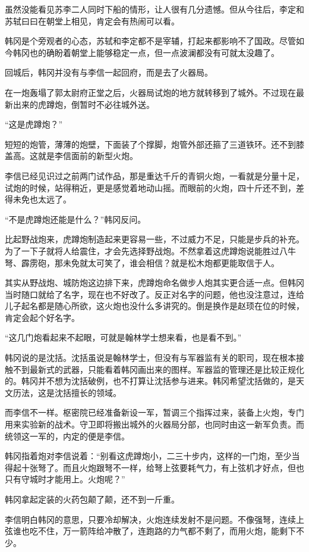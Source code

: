 虽然没能看见苏李二人同时下船的情形，让人很有几分遗憾。但从今往后，李定和苏轼曰曰在朝堂上相见，肯定会有热闹可以看。

韩冈是个旁观者的心态，苏轼和李定都不是宰辅，打起来都影响不了国政。尽管如今韩冈也的确盼着朝堂上能够稳定一点，但一点波澜都没有可就太没趣了。

回城后，韩冈并没有与李信一起回府，而是去了火器局。

在一炮轰塌了郭太尉府正堂之后，火器局试炮的地方就转移到了城外。不过现在最新出来的虎蹲炮，倒暂时不必往城外送。

“这是虎蹲炮？”

短短的炮管，薄薄的炮壁，下面装了个撑脚，炮管外部还箍了三道铁环。还不到膝盖高。这就是李信面前的新型火炮。

李信已经见识过之前两门试作品，那是重达千斤的青铜火炮，一看就是分量十足，试炮的时候，站得稍近，更是感觉着地动山摇。而眼前的火炮，四十斤还不到，差得未免也太远了。

“不是虎蹲炮还能是什么？”韩冈反问。

比起野战炮来，虎蹲炮制造起来更容易一些，不过威力不足，只能是步兵的补充。为了一下子就将人给震住，才会先选择野战炮。不然拿着这虎蹲炮说能胜过八牛弩、霹雳砲，那未免就太可笑了，谁会相信？就是松木炮都更能取信于人。

其实从野战炮、城防炮这边排下来，虎蹲炮命名做步人炮其实更合适一点。但韩冈当时随口就给了名字，现在也不好改了。反正对名字的问题，他也没注意过，连给儿子起名都是随心所欲，这火炮也没什么多讲究的。倒是换作是赵顼在位的时候，肯定会起个好名字。

“这几门炮看起来不起眼，可就是翰林学士想来看，也是看不到。”

韩冈说的是沈括。沈括虽说是翰林学士，但没有与军器监有关的职司，现在根本接触不到最新式的武器，只能看着韩冈画出来的图样。军器监的管理还是比较正规化的。韩冈并不想为沈括破例，也不打算让沈括参与进来。韩冈希望沈括做的，是天文历法，这是沈括擅长的领域。

而李信不一样。枢密院已经准备新设一军，暂调三个指挥过来，装备上火炮，专门用来实验新的战术。守卫即将搬出城外的火器局分部，也同时由这一新军负责。而统领这一军的，内定的便是李信。

韩冈指着炮对李信说着：“别看这虎蹲炮小，二三十步内，这样的一门炮，至少当得起十张弩了。而且火炮跟弩不一样，给弩上弦要耗气力，有上弦机才好点，但也只有守城时才能用上。火炮呢？”

韩冈拿起定装的火药包颠了颠，还不到一斤重。

李信明白韩冈的意思，只要冷却解决，火炮连续发射不是问题。不像强弩，连续上弦谁也吃不住，万一箭阵给冲散了，连跑路的力气都不剩了，而用火炮，能剩下不少。

